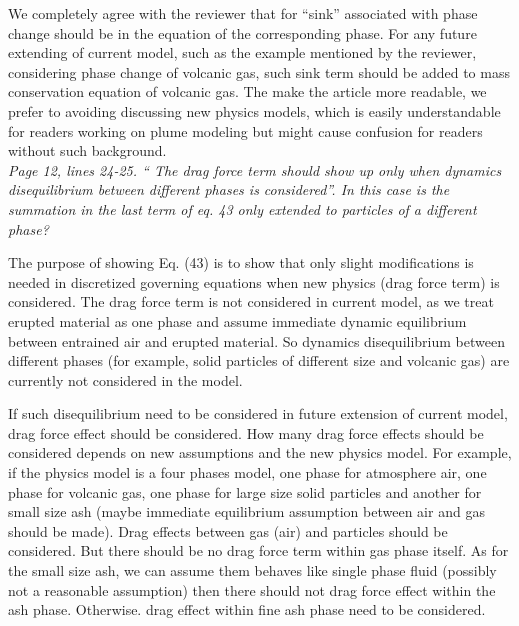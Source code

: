 \documentclass[10pt,a4paper]{article}
\begin{document}
We completely agree with the reviewer that for “sink” associated with phase change should be in the equation of the corresponding phase. For any future extending of current model, such as the example mentioned by the reviewer, considering phase change of volcanic gas, such sink term should be added to mass conservation equation of volcanic gas. The make the article more readable, we prefer to avoiding discussing new physics models, which is easily understandable for readers working on plume modeling but might cause confusion for readers without such background.
\\[3pt]

\textit {Page 12, lines 24-25. “ The drag force term should show up only when dynamics disequilibrium between different phases is considered”. In this case is the summation in the last term of eq. 43 only extended to particles of a different phase?}

The purpose of showing Eq. (43)  is to show that only slight modifications is needed in discretized governing equations when new physics (drag force term) is considered. The drag force term is not considered in current model, as we treat erupted material as one phase and assume immediate dynamic equilibrium between entrained air and erupted material. 
So dynamics disequilibrium between different phases (for example, solid particles of different size and volcanic gas) are currently not considered in the model.

If such disequilibrium need to be considered in future extension of current model, drag force effect should be considered. How many drag force effects should be considered depends on new assumptions and the new physics model. For example, if the physics model is a four phases model, one phase for atmosphere air, one phase for volcanic gas, one phase for large size solid particles and another for small size ash (maybe immediate equilibrium assumption between air and gas should be made). Drag effects between gas (air) and particles should be considered. But there should be no drag force term within gas phase itself. As for the small size ash, we can assume them behaves like single phase fluid (possibly not a reasonable assumption) then there should not drag force effect within the ash phase. Otherwise. drag effect within fine ash phase need to be considered.
\end{document}
